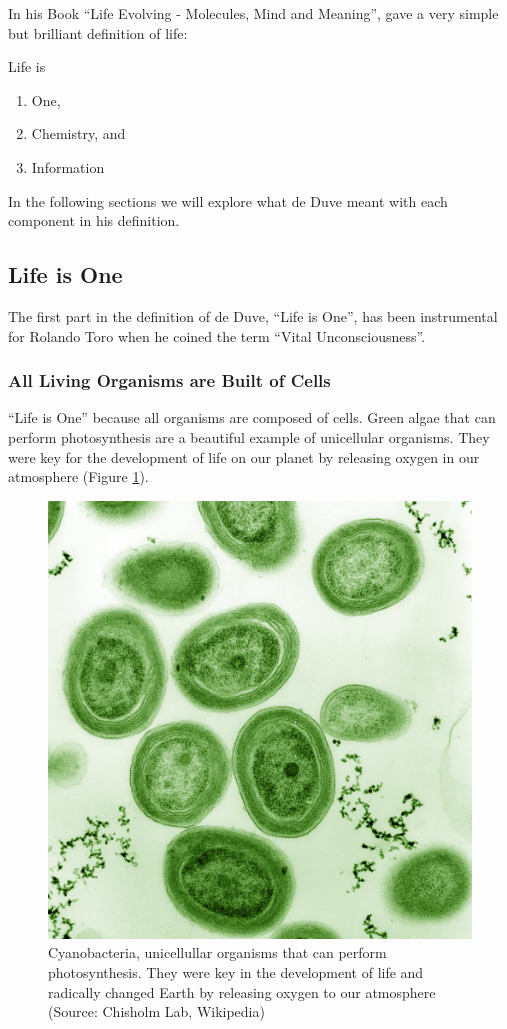 \documentclass[
  11pt,
]{book}
\providecommand{\tightlist}{%
  \setlength{\itemsep}{0pt}\setlength{\parskip}{0pt}}
\begin{document}
In his Book ``Life Evolving - Molecules, Mind and Meaning'', \citet{deDuve2002} gave a very simple but brilliant definition of life:

Life is

\begin{enumerate}
\def\labelenumi{\arabic{enumi}.}
\tightlist
\item
  One,
\item
  Chemistry, and
\item
  Information
\end{enumerate}

In the following sections we will explore what de Duve meant with each component in his definition.

\hypertarget{life-is-one}{%
\subsection{Life is One}\label{life-is-one}}

The first part in the definition of de Duve, ``Life is One'', has been instrumental for Rolando Toro when he coined the term ``Vital Unconsciousness''.

\hypertarget{all-living-organisms-are-built-of-cells}{%
\subsubsection{All Living Organisms are Built of Cells}\label{all-living-organisms-are-built-of-cells}}

``Life is One'' because all organisms are composed of cells.
Green algae that can perform photosynthesis are a beautiful example of unicellular organisms. They were key for the development of life on our planet by releasing oxygen in our atmosphere (Figure \ref{fig:greenAlgae}).

\begin{figure}

{\centering \includegraphics[width=0.3\linewidth]{./figs/Prochlorococcus_marinus} 

}

\caption{Cyanobacteria, unicellullar organisms that can perform photosynthesis. They were key in the development of life and radically changed Earth by releasing oxygen to our atmosphere (Source: Chisholm Lab, Wikipedia)}\label{fig:greenAlgae}
\end{figure}
\end{document}
